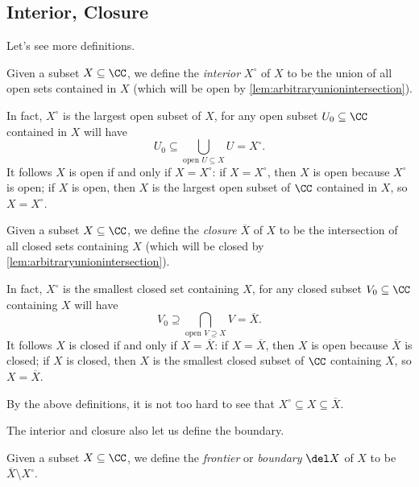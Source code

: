 \subsection{Interior, Closure}
Let's see more definitions.
\begin{definition}[Interior]
	Given a subset $X\subseteq\CC$, we define the \textit{interior} $X^\circ$ of $X$ to be the union of all open sets contained in $X$ (which will be open by \autoref{lem:arbitraryunionintersection}).
\end{definition}
\begin{remark}
	In fact, $X^\circ$ is the largest open subset of $X$, for any open subset $U_0\subseteq\CC$ contained in $X$ will have
	\[U_0\subseteq\bigcup_{\text{open }U\subseteq X}U=X^\circ.\]
	It follows $X$ is open if and only if $X=X^\circ$: if $X=X^\circ$, then $X$ is open because $X^\circ$ is open; if $X$ is open, then $X$ is the largest open subset of $\CC$ contained in $X$, so $X=X^\circ$.
\end{remark}
\begin{definition}[Closure]
	Given a subset $X\subseteq\CC$, we define the \textit{closure} $\overline X$ of $X$ to be the intersection of all closed sets containing $X$ (which will be closed by \autoref{lem:arbitraryunionintersection}).
\end{definition}
\begin{remark}
	In fact, $X^\circ$ is the smallest closed set containing $X$, for any closed subset $V_0\subseteq\CC$ containing $X$ will have
	\[V_0\supseteq\bigcap_{\text{open }V\supseteq X}V=\overline X.\]
	It follows $X$ is closed if and only if $X=\overline X$: if $X=\overline X$, then $X$ is open because $\overline X$ is closed; if $X$ is closed, then $X$ is the smallest closed subset of $\CC$ containing $X$, so $X=\overline X$.
\end{remark}
By the above definitions, it is not too hard to see that $X^\circ\subseteq X\subseteq\overline X$.

The interior and closure also let us define the boundary.
\begin{definition}
	Given a subset $X\subseteq\CC$, we define the \textit{frontier} or \textit{boundary} $\del X$ of $X$ to be $\overline X\setminus X^\circ$.
\end{definition}

